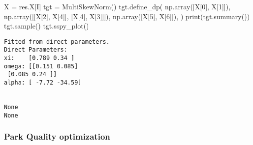 \documentclass[
  letterpaper,
  DIV=11,
  numbers=noendperiod]{scrartcl}
\newenvironment{Shaded}{\begin{snugshade}}{\end{snugshade}}
\newcommand{\BuiltInTok}[1]{\textcolor[rgb]{0.00,0.23,0.31}{#1}}
\newcommand{\DecValTok}[1]{\textcolor[rgb]{0.68,0.00,0.00}{#1}}
\newcommand{\NormalTok}[1]{\textcolor[rgb]{0.00,0.23,0.31}{#1}}
\newcommand{\OperatorTok}[1]{\textcolor[rgb]{0.37,0.37,0.37}{#1}}
\begin{document}
\begin{Shaded}
\begin{Highlighting}[]
\NormalTok{X }\OperatorTok{=}\NormalTok{ res.X[I]}
\NormalTok{tgt }\OperatorTok{=}\NormalTok{ MultiSkewNorm()}
\NormalTok{tgt.define\_dp(}
\NormalTok{    np.array([X[}\DecValTok{0}\NormalTok{], X[}\DecValTok{1}\NormalTok{]]),}
\NormalTok{    np.array([[X[}\DecValTok{2}\NormalTok{], X[}\DecValTok{4}\NormalTok{]], [X[}\DecValTok{4}\NormalTok{], X[}\DecValTok{3}\NormalTok{]]]),}
\NormalTok{    np.array([X[}\DecValTok{5}\NormalTok{], X[}\DecValTok{6}\NormalTok{]]),}
\NormalTok{)}
\BuiltInTok{print}\NormalTok{(tgt.summary())}
\NormalTok{tgt.sample()}
\NormalTok{tgt.sspy\_plot()}
\end{Highlighting}
\end{Shaded}

\begin{verbatim}
Fitted from direct parameters.
Direct Parameters:
xi:    [0.789 0.34 ]
omega: [[0.151 0.085]
 [0.085 0.24 ]]
alpha: [ -7.72 -34.59]


None
None
\end{verbatim}

\begin{figure}[H]


\caption{\label{fig-pymoo-overall-target}}

\end{figure}%

\subsubsection{Park Quality
optimization}\label{park-quality-optimization}
\end{document}
